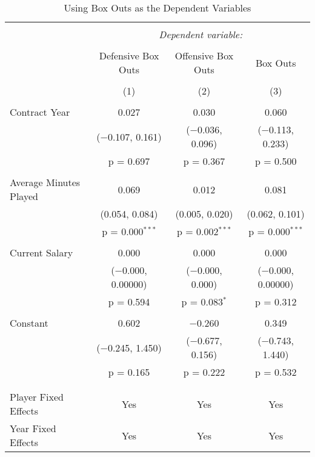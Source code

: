 \documentclass[12pt]{article}
\begin{document}
	\begin{landscape}
		\begin{table}[!htbp] \centering 
			\caption{Using Box Outs as the Dependent Variables} 
			\label{regboxout} 
			\begin{tabular}{@{\extracolsep{5pt}}lccc} 
				\\[-1.8ex]\hline 
				\hline \\[-1.8ex] 
				& \multicolumn{3}{c}{\textit{Dependent variable:}} \\ 
				\cline{2-4} 
				\\[-1.8ex] & Defensive Box Outs & Offensive Box Outs & Box Outs \\ 
				\\[-1.8ex] & (1) & (2) & (3)\\ 
				\hline \\[-1.8ex] 
				Contract Year & 0.027 & 0.030 & 0.060 \\ 
				& ($-$0.107, 0.161) & ($-$0.036, 0.096) & ($-$0.113, 0.233) \\ 
				& p = 0.697 & p = 0.367 & p = 0.500 \\ 
				& & & \\ 
				Average Minutes Played & 0.069 & 0.012 & 0.081 \\ 
				& (0.054, 0.084) & (0.005, 0.020) & (0.062, 0.101) \\ 
				& p = 0.000$^{***}$ & p = 0.002$^{***}$ & p = 0.000$^{***}$ \\ 
				& & & \\ 
				Current Salary & 0.000 & 0.000 & 0.000 \\ 
				& ($-$0.000, 0.00000) & ($-$0.000, 0.000) & ($-$0.000, 0.00000) \\ 
				& p = 0.594 & p = 0.083$^{*}$ & p = 0.312 \\ 
				& & & \\ 
				Constant & 0.602 & $-$0.260 & 0.349 \\ 
				& ($-$0.245, 1.450) & ($-$0.677, 0.156) & ($-$0.743, 1.440) \\ 
				& p = 0.165 & p = 0.222 & p = 0.532 \\ 
				& & & \\ 
				\hline \\[-1.8ex] 
				Player Fixed Effects & Yes & Yes & Yes \\ 
				Year Fixed Effects & Yes & Yes & Yes \\ 

\end{tabular}
\end{table}
\end{landscape}
\end{document}
